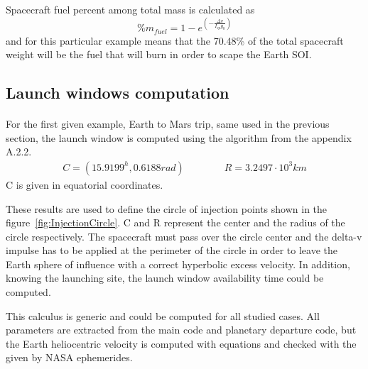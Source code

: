 	Spacecraft fuel percent among total mass is calculated as
	\begin{equation}
		\%m_{fuel} = 1-e^{(-\frac{\Delta v}{I_{sp}g_0})}
	\end{equation}
	and for this particular example means that the 70.48\% of the total spacecraft weight will be the fuel that will burn in order to scape the Earth SOI.
	\subsection{Launch windows computation}
\paragraph{}	For the first given example, Earth to Mars trip, same used in the previous section, the launch window is computed using the algorithm from the appendix A.2.2.
\begin{align*}
	C=(15.9199^h, 0.6188rad)  \qquad \qquad R=3.2497\cdot10^3 km
\end{align*}
C is given in equatorial coordinates.

These results are used to define the circle of injection points shown in the figure~\ref{fig:InjectionCircle}. C and R represent the center and the radius of the circle respectively. The spacecraft must pass over the circle center and the delta-v impulse has to be applied at the perimeter of the circle in order to leave the Earth sphere of influence with a correct hyperbolic excess velocity. In addition, knowing the launching site, the launch window availability time could be computed. 

This calculus is generic and could be computed for all studied cases. All parameters are extracted from the main code and planetary departure code, but the Earth heliocentric velocity is computed with \cite{llibreVictor} equations and checked with the given by NASA ephemerides.


	
